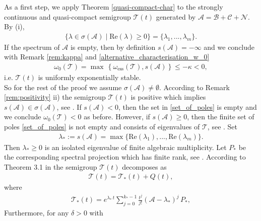 \documentclass[12pt,a4paper]{amsart}
\newenvironment{proofof}[1]
{\smallskip\noindent{\textbf{Proof~of~#1.}}
\hspace{1pt}}{\hspace{-5pt}{\nobreak\nobreak\hfill\nobreak
$\square$\vspace{2pt}\par}\smallskip\goodbreak}
\begin{document}
\begin{proofof}{Theorem \ref{mainresult}}
As a first step, we apply Theorem \ref{quasi-compact-char} to the strongly continuous and quasi-compact semigroup $\mathcal{T}(t)$ generated by $\mathcal{A}=\mathcal{B}+\mathcal{C}+\mathcal{N}$. By (i), 
    \begin{align}
    \label{set_of_poles}
      \{\lambda \in \sigma(\mathcal{A})\mid\mathrm{Re}(\lambda)\geq 0\}=\{\lambda_1,...,\lambda_m\}. 
    \end{align}
If the spectrum of $\mathcal{A}$ is empty, then by definition $s(\mathcal{A})=-\infty$ and we conclude with Remark \ref{rem:kappa} and \eqref{alternative_characterisation_w_0}	
    \begin{align*}
    \omega_0\left({\mathcal T}\right)= \max\,\left\{\omega_\text{ess}\left({\mathcal T}\right), s\left({\mathcal A}\right)\right\}\leq-\kappa<0,
    \end{align*}
i.e. $\mathcal{T}(t)$ is uniformly exponentially stable.\\
So for the rest of the proof we assume $\sigma(\mathcal{A})\neq \emptyset$. According to Remark \ref{rem:positivity} ii) the semigroup $\mathcal{T}(t)$ is positive which implies $s(\mathcal{A})\in\sigma(\mathcal{A})$, see \cite[Ch. VI, Theorem 1.10]{EngelNagel}. If  $s(\mathcal{A})< 0$, then the set in \eqref{set_of_poles} is empty and we conclude $\omega_0(\mathcal{T})<0$ as before. However, if $s(\mathcal{A})\geq 0$, then the finite set of poles  \eqref{set_of_poles} is not empty and consists of eigenvalues of $\mathcal{T}$, see \cite[VIII.8, Theorem 3]{Yosida}. Set 
    \begin{align*}
    \lambda_*:=s(\mathcal{A})=\max\{\mathrm{Re}(\lambda_1),...,\mathrm{Re}(\lambda_m)\}.
    \end{align*}
Then $\lambda_*\geq 0$ is an isolated eigenvalue of finite algebraic multiplicity. Let $P_*$ be the corresponding spectral projection which has finite rank, see \cite[Ch. IV, Cor 2.11]{EngelNagel}. According to Theorem 3.1 in \cite[Ch.V]{EngelNagel} the semigroup $\mathcal{T}(t)$ decomposes as 
    \begin{align*}
    \mathcal{T}(t)=\mathcal{T}_*(t) + Q(t),
    \end{align*}
where
    \begin{align*}
    \mathcal{T}_*(t)=e^{\lambda_*\, t}\sum_{j=0}^{k_*-1}\frac{t^j}{j!}\left(\mathcal{A}-\lambda_*\right)^j\, P_*,
    \end{align*}
Furthermore, for any $\delta>0$ with
    \begin{align*}

\end{align*}
\end{proofof}
\end{document}

